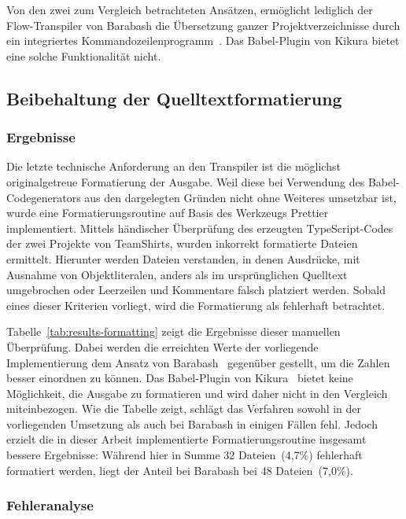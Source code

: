Von den zwei zum Vergleich betrachteten Ansätzen, ermöglicht lediglich der Flow-Transpiler von Barabash die Übersetzung ganzer Projektverzeichnisse durch ein integriertes Kommandozeilenprogramm~\autocite{BARABASH:FLOW_TO_TS}. Das Babel-Plugin von Kikura bietet eine solche Funktionalität nicht.

\subsection{Beibehaltung der Quelltextformatierung}
\label{sec:results-formatting}

\subsubsection{Ergebnisse}

Die letzte technische Anforderung an den Transpiler ist die möglichst originalgetreue Formatierung der Ausgabe. Weil diese bei Verwendung des Babel-Codegenerators aus den dargelegten Gründen nicht ohne Weiteres umsetzbar ist, wurde eine Formatierungsroutine auf Basis des Werkzeugs Prettier~\autocite{SOFTWARE:PRETTIER} implementiert. Mittels händischer Überprüfung des erzeugten TypeScript-Codes der zwei Projekte von TeamShirts, wurden inkorrekt formatierte Dateien ermittelt. Hierunter werden Dateien verstanden, in denen Ausdrücke, mit Ausnahme von Objektliteralen, anders als im ursprünglichen Quelltext umgebrochen oder Leerzeilen und Kommentare falsch platziert werden. Sobald eines dieser Kriterien vorliegt, wird die Formatierung als fehlerhaft betrachtet.

Tabelle~\ref{tab:results-formatting} zeigt die Ergebnisse dieser manuellen Überprüfung. Dabei werden die erreichten Werte der vorliegende Implementierung dem Ansatz von Barabash~\autocite{BARABASH:FLOW_TO_TS} gegenüber gestellt, um die Zahlen besser einordnen zu können. Das Babel-Plugin von Kikura~\autocite{KIKURA:FLOW_TO_TS} bietet keine Möglichkeit, die Ausgabe zu formatieren und wird daher nicht in den Vergleich miteinbezogen.
Wie die Tabelle zeigt, schlägt das Verfahren sowohl in der vorliegenden Umsetzung als auch bei Barabash in einigen Fällen fehl. Jedoch erzielt die in dieser Arbeit implementierte Formatierungsroutine insgesamt bessere Ergebnisse: Während hier in Summe 32 Dateien~(4,7\%) fehlerhaft formatiert werden, liegt der Anteil bei Barabash bei 48 Dateien~(7,0\%).

\tablespace


\subsubsection{Fehleranalyse}

